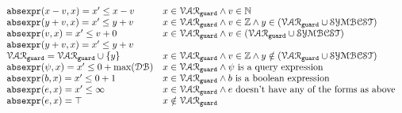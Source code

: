 
  \[
    \begin{array}{ll} 
      \mathtt{abs}{\mathtt{expr}}(x - v, x)  = x' \leq x - v  & x \in \mathcal{VAR}_{\mathtt{guard}} \land v \in \mathbb{N} \\
      \mathtt{abs}{\mathtt{expr}}(y + v, x)  = x' \leq y + v  & x \in \mathcal{VAR}_{\mathtt{guard}} \land v \in \mathbb{Z} \land y \in (\mathcal{VAR}_{\mathtt{guard}} \cup \mathcal{SYMBCST}) \\
      \mathtt{abs}{\mathtt{expr}}(v, x)  = x' \leq v + 0  & x \in \mathcal{VAR}_{\mathtt{guard}} \land v \in (\mathcal{VAR}_{\mathtt{guard}} \cup \mathcal{SYMBCST}) \\
      \mathtt{abs}{\mathtt{expr}}(y + v, x)  = x' \leq y + v & \\
      \mathcal{VAR}_{\mathtt{guard}} = \mathcal{VAR}_{\mathtt{guard}} \cup \{y\} & x \in \mathcal{VAR}_{\mathtt{guard}} \land v \in \mathbb{Z} \land y \notin (\mathcal{VAR}_{\mathtt{guard}} \cup \mathcal{SYMBCST})  \\
      \mathtt{abs}{\mathtt{expr}}(\psi, x)  = x' \leq 0 + \max(\mathcal{DB}) & x \in \mathcal{VAR}_{\mathtt{guard}} \land \psi \text{ is a query expression}  \\
      \mathtt{abs}{\mathtt{expr}}(b, x) = x' \leq 0 + 1   & x \in \mathcal{VAR}_{\mathtt{guard}} \land b \text{ is a boolean expression} \\
      \mathtt{abs}{\mathtt{expr}}(e, x) = x' \leq \infty  &  x \in \mathcal{VAR}_{\mathtt{guard}} \land e \text{ doesn't have any of the forms as above} \\
      \mathtt{abs}{\mathtt{expr}}(e, x) = \top  &  x \notin \mathcal{VAR}_{\mathtt{guard}} \\
    \end{array}
    \]
  
